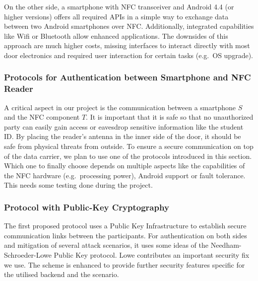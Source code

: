 On the other side, a smartphone with NFC transceiver and Android 4.4 (or higher versions) offers all required APIs in a simple way to exchange data between two Android smartphones over NFC.
Additionally, integrated capabilities like Wifi or Bluetooth allow enhanced applications. The downsides of this approach are much higher costs, missing interfaces to interact directly with most door electronics and required user interaction for certain tasks (e.g.~OS upgrade).



\subsubsection{Protocols for Authentication between Smartphone and NFC Reader}\label{sec:alt:proto}
A critical aspect in our project is the communication between a smartphone $ S $ and the NFC component $ T $.
It is important that it is safe so that no unauthorized party can easily gain access or eavesdrop sensitive information like the student ID.
By placing the reader's antenna in the inner side of the door, it should be safe from physical threats from outside.
To ensure a secure communication on top of the data carrier, we plan to use one of the protocols introduced in this section.
Which one to finally choose depends on multiple aspects like the capabilities of the NFC hardware (e.g.~processing power), Android support or fault tolerance. This needs some testing done during the project. 

\subsubsection{Protocol with Public-Key Cryptography}\label{sec:alt:proto:pubkey}
The first proposed protocol uses a Public Key Infrastructure to establish secure communication links between the participants.
For authentication on both sides and mitigation of several attack scenarios, it uses some ideas of the Needham-Schroeder-Lowe Public Key protocol. Lowe contributes an important security fix we use.
The scheme is enhanced to provide further security features specific for the utilised backend and the scenario.

